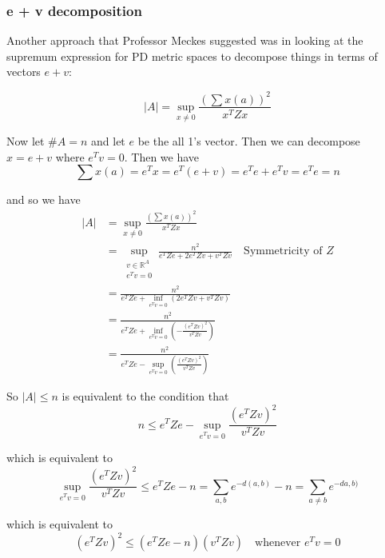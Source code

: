 \documentclass[11pt]{article}
\theoremstyle{definition}
\theoremstyle{definition}
\theoremstyle{plain}
\theoremstyle{plain}
\theoremstyle{plain}
\theoremstyle{definition}
\begin{document}
\subsubsection*{e + v decomposition}

Another approach that Professor Meckes suggested was in looking at the supremum expression for PD metric spaces to decompose things in terms of vectors $e + v$:

\begin{equation*}
\vert A \vert = \sup\limits_{x\neq0}\frac{\left(\sum x(a)\right)^2}{x^T Z x}
\end{equation*}

Now let $\#A = n$ and let $e$ be the all 1's vector. Then we can decompose $x = e + v$ where $e^T v = 0$. Then we have
\begin{equation*}
\sum x(a) = e^T x = e^T(e + v) = e^Te + e^Tv = e^Te = n
\end{equation*}

and so we have
\begin{align*}
\vert A \vert &= \sup\limits_{x\neq0}\frac{\left(\sum x(a)\right)^2}{x^T Z x} \\
&= \sup\limits_{\substack{v \in \mathbb{R}^A \\ e^Tv = 0}}\frac{n^2}{e^TZe + 2e^TZv + v^TZv} \quad\text{Symmetricity of $Z$}\\
&= \frac{n^2}{e^TZe + \inf\limits_{e^Tv = 0}(2e^TZv + v^TZv)} \\
&= \frac{n^2}{e^TZe + \inf\limits_{e^Tv=0}\left(-\frac{(e^TZv)^2}{v^TZv}\right)} \\
&= \frac{n^2}{e^TZe - \sup\limits_{e^Tv=0}\left(\frac{(e^TZv)^2}{v^TZv}\right)}
\end{align*}

So $\vert A \vert \leq n$ is equivalent to the condition that
\begin{equation*}
n \leq e^TZe - \sup\limits_{e^Tv = 0}\frac{(e^TZv)^2}{v^TZv}
\end{equation*}

which is equivalent to
\begin{equation*}
\sup\limits_{e^Tv=0}\frac{(e^TZv)^2}{v^TZv} \leq e^TZe - n = \sum\limits_{a,b}e^{-d(a,b)} - n = \sum\limits_{a\neq b} e^{-d{a,b)}}
\end{equation*}

which is equivalent to
\begin{equation*}
(e^TZv)^2 \leq (e^TZe - n)(v^TZv) \quad\text{whenever $e^Tv = 0$}
\end{equation*}
\end{document}
